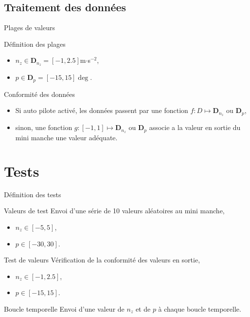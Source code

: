 \documentclass[footheight=2em]{beamer}
\begin{document}
\subsection{Traitement des données}
\begin{frame}[t]{Plages de valeurs}
  \begin{block}{Définition des plages}
    \begin{itemize}
      \item \(n_z \in \mathbf{D}_{n_z} = [-1, 2.5]\)m\(\cdot\)s\(^{-2}\),
      \item \(p \in \mathbf{D}_p = [-15, 15]\deg\).
    \end{itemize}
  \end{block}
  \begin{block}{Conformité des données}
    \begin{itemize}
      \item Si auto pilote activé, les données passent par une
        fonction \(f\colon D \mapsto \mathbf{D}_{n_z}\) ou \(\mathbf{D}_p\),
      \item sinon, une fonction \(g\colon[-1, 1] \mapsto \mathbf{D}_{n_z}\) ou
        \(\mathbf{D}_p\) associe a la valeur en sortie du mini manche une valeur
        adéquate.
    \end{itemize}
  \end{block}
\end{frame}


\section{Tests}
\begin{frame}[t]{Définition des tests}
  \begin{block}{Valeurs de test}
    Envoi d'une série de 10 valeurs aléatoires au mini manche,
    \begin{itemize}
      \item \(n_z \in [-5, 5]\),
      \item \(p \in [-30, 30]\).
    \end{itemize}
  \end{block}
  \begin{block}{Test de valeurs}
    Vérification de la conformité des valeurs en sortie,
    \begin{itemize}
      \item \(n_z \in [-1, 2.5]\),
      \item \(p \in [-15, 15]\).
    \end{itemize}
  \end{block}
  \begin{block}{Boucle temporelle}
    Envoi d'une valeur de \(n_z\) et de \(p\) à chaque boucle temporelle.
  \end{block}
\end{frame}
\end{document}
